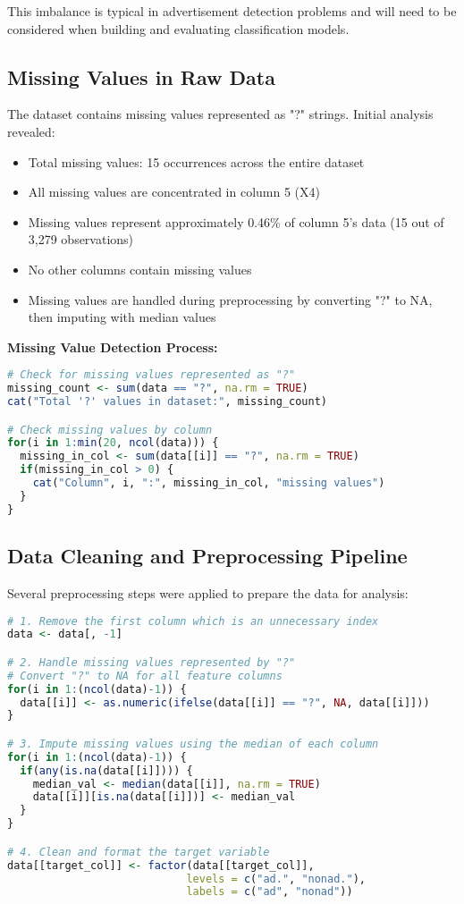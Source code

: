 This imbalance is typical in advertisement detection problems and will need to be considered when building and evaluating classification models.

\subsection{Missing Values in Raw Data}
The dataset contains missing values represented as "?" strings. Initial analysis revealed:
\begin{itemize}
    \item Total missing values: 15 occurrences across the entire dataset
    \item All missing values are concentrated in column 5 (X4)
    \item Missing values represent approximately 0.46\% of column 5's data (15 out of 3,279 observations)
    \item No other columns contain missing values
    \item Missing values are handled during preprocessing by converting "?" to NA, then imputing with median values
\end{itemize}

\textbf{Missing Value Detection Process:}
\begin{lstlisting}[language=R]
# Check for missing values represented as "?"
missing_count <- sum(data == "?", na.rm = TRUE)
cat("Total '?' values in dataset:", missing_count)

# Check missing values by column
for(i in 1:min(20, ncol(data))) {
  missing_in_col <- sum(data[[i]] == "?", na.rm = TRUE)
  if(missing_in_col > 0) {
    cat("Column", i, ":", missing_in_col, "missing values")
  }
}
\end{lstlisting}

\subsection{Data Cleaning and Preprocessing Pipeline}
Several preprocessing steps were applied to prepare the data for analysis:

\begin{lstlisting}[language=R]
# 1. Remove the first column which is an unnecessary index
data <- data[, -1]

# 2. Handle missing values represented by "?"
# Convert "?" to NA for all feature columns
for(i in 1:(ncol(data)-1)) {
  data[[i]] <- as.numeric(ifelse(data[[i]] == "?", NA, data[[i]]))
}

# 3. Impute missing values using the median of each column
for(i in 1:(ncol(data)-1)) {
  if(any(is.na(data[[i]]))) {
    median_val <- median(data[[i]], na.rm = TRUE)
    data[[i]][is.na(data[[i]])] <- median_val
  }
}

# 4. Clean and format the target variable
data[[target_col]] <- factor(data[[target_col]], 
                            levels = c("ad.", "nonad."), 
                            labels = c("ad", "nonad"))
\end{lstlisting}

